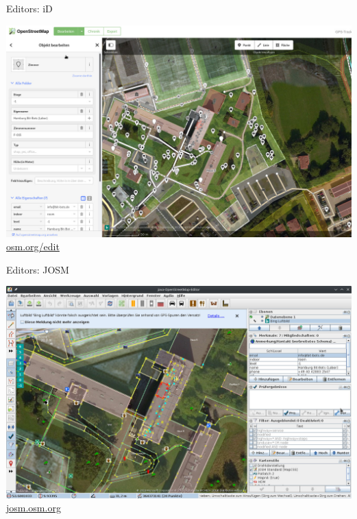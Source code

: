 \documentclass{beamer}
\begin{document}
			\begin{frame}{Editors: iD}
				\begin{center}
					\includegraphics[height=0.75\textheight]{images/id-editor.jpg}
					\href{https://www.openstreetmap.org/edit}{osm.org/edit}
				\end{center}
			\end{frame}
			
			\begin{frame}{Editors: JOSM}
				\begin{center}
					\includegraphics[height=0.75\textheight]{images/josm-editor.jpg}
					\href{https://josm.openstreetmap.de/}{josm.osm.org}
				\end{center}
			\end{frame}
			
\end{document}
